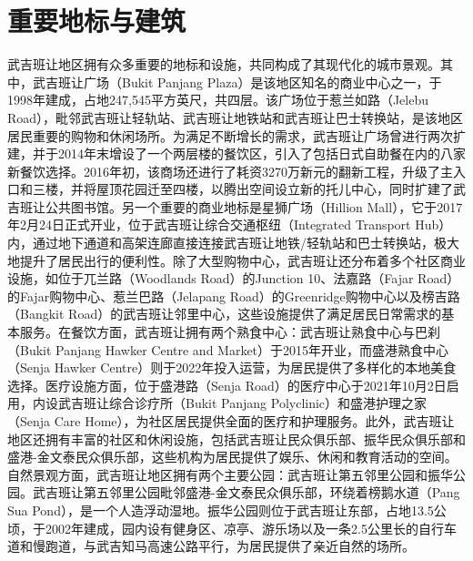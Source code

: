 \documentclass[11pt,a4paper,twoside,openany]{book}
\begin{document}
\section{重要地标与建筑}
武吉班让地区拥有众多重要的地标和设施，共同构成了其现代化的城市景观。其中，武吉班让广场（Bukit Panjang Plaza）是该地区知名的商业中心之一，于1998年建成，占地247,545平方英尺，共四层。该广场位于惹兰如路（Jelebu Road），毗邻武吉班让轻轨站、武吉班让地铁站和武吉班让巴士转换站，是该地区居民重要的购物和休闲场所。为满足不断增长的需求，武吉班让广场曾进行两次扩建，并于2014年末增设了一个两层楼的餐饮区，引入了包括日式自助餐在内的八家新餐饮选择。2016年初，该商场还进行了耗资3270万新元的翻新工程，升级了主入口和三楼，并将屋顶花园迁至四楼，以腾出空间设立新的托儿中心，同时扩建了武吉班让公共图书馆。另一个重要的商业地标是星狮广场（Hillion Mall），它于2017年2月24日正式开业，位于武吉班让综合交通枢纽（Integrated Transport Hub）内，通过地下通道和高架连廊直接连接武吉班让地铁/轻轨站和巴士转换站，极大地提升了居民出行的便利性。除了大型购物中心，武吉班让还分布着多个社区商业设施，如位于兀兰路（Woodlands Road）的Junction 10、法嘉路（Fajar Road）的Fajar购物中心、惹兰巴路（Jelapang Road）的Greenridge购物中心以及榜吉路（Bangkit Road）的武吉班让邻里中心，这些设施提供了满足居民日常需求的基本服务。在餐饮方面，武吉班让拥有两个熟食中心：武吉班让熟食中心与巴刹（Bukit Panjang Hawker Centre and Market）于2015年开业，而盛港熟食中心（Senja Hawker Centre）则于2022年投入运营，为居民提供了多样化的本地美食选择。医疗设施方面，位于盛港路（Senja Road）的医疗中心于2021年10月2日启用，内设武吉班让综合诊疗所（Bukit Panjang Polyclinic）和盛港护理之家（Senja Care Home），为社区居民提供全面的医疗和护理服务。此外，武吉班让地区还拥有丰富的社区和休闲设施，包括武吉班让民众俱乐部、振华民众俱乐部和盛港-金文泰民众俱乐部，这些机构为居民提供了娱乐、休闲和教育活动的空间。自然景观方面，武吉班让地区拥有两个主要公园：武吉班让第五邻里公园和振华公园。武吉班让第五邻里公园毗邻盛港-金文泰民众俱乐部，环绕着榜鹅水道（Pang Sua Pond），是一个人造浮动湿地。振华公园则位于武吉班让东部，占地13.5公顷，于2002年建成，园内设有健身区、凉亭、游乐场以及一条2.5公里长的自行车道和慢跑道，与武吉知马高速公路平行，为居民提供了亲近自然的场所。
\end{document}

